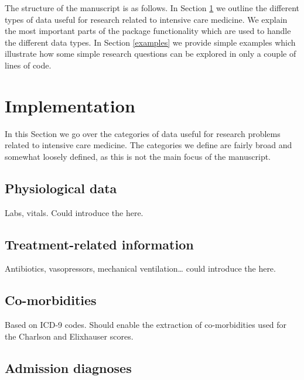 \documentclass[
]{jss}
\begin{document}
The structure of the manuscript is as follows. In Section
\ref{implementation} we outline the different types of data useful for
research related to intensive care medicine. We explain the most
important parts of the package functionality which are used to handle
the different data types. In Section \ref{examples} we provide simple
examples which illustrate how some simple research questions can be
explored in only a couple of lines of code.

\hypertarget{implementation}{%
\section{Implementation}\label{implementation}}

In this Section we go over the categories of data useful for research
problems related to intensive care medicine. The categories we define
are fairly broad and somewhat loosely defined, as this is not the main
focus of the manuscript.

\hypertarget{physiological-data}{%
\subsection{Physiological data}\label{physiological-data}}

Labs, vitals. Could introduce the  here.

\hypertarget{treatment-related-information}{%
\subsection{Treatment-related
information}\label{treatment-related-information}}

Antibiotics, vasopressors, mechanical ventilation\ldots{} could
introduce the  here.

\hypertarget{co-morbidities}{%
\subsection{Co-morbidities}\label{co-morbidities}}

Based on ICD-9 codes. Should enable the extraction of co-morbidities
used for the Charlson and Elixhauser scores.

\hypertarget{admission-diagnoses}{%
\subsection{Admission diagnoses}\label{admission-diagnoses}}
\end{document}
